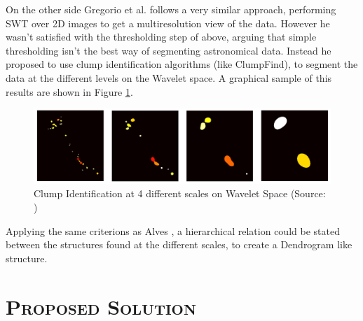 \documentclass[letter, 11pt]{article}
\begin{document}
\begin{description}
    On the other side Gregorio et al. \cite{Gregorio} follows a very similar approach, performing SWT over 2D images to get a multiresolution view of the data. However he wasn't satisfied with the thresholding step of above, arguing that  simple thresholding isn't the best way of segmenting astronomical data. Instead he proposed to use clump identification algorithms (like ClumpFind), to segment the data at the different levels on the Wavelet space. A graphical sample of this results are shown in Figure \ref{fig:greg}.
    \begin{figure}[htpb!]
    \centering
    \includegraphics[width=14cm]{greg}
    \caption{Clump Identification at 4 different scales on Wavelet Space (Source: \cite{Gregorio})}
    \label{fig:greg}
    \end{figure}
    Applying the same criterions as Alves \cite{Alves}, a hierarchical relation could be stated between the structures found at the different scales, to create a Dendrogram like structure.
\end{description}



\newpage
\section{\textsc{Proposed Solution}} \label{proposal}
\end{document}

